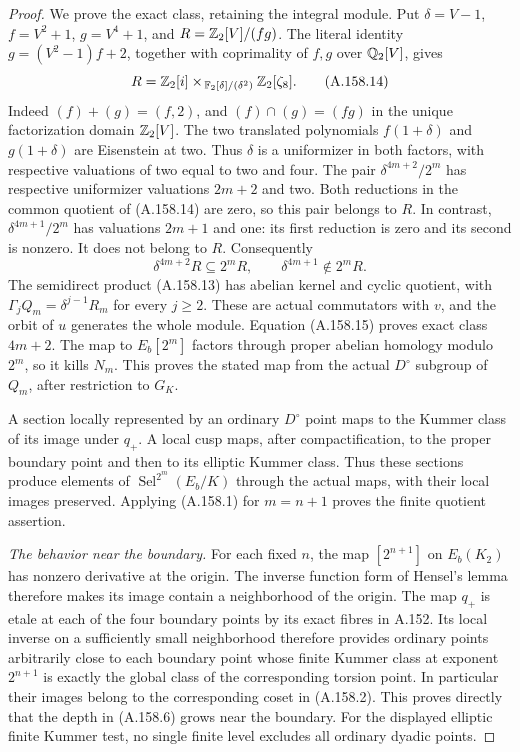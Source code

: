 \begin{proof}
We prove the exact class, retaining the integral module.
Put \(\delta=V-1\), \(f=V^2+1\), \(g=V^4+1\), and
\(R=\mathbb Z_2[V]/(fg)\).  The literal identity
\(g=(V^2-1)f+2\), together with coprimality of \(f,g\)
over \(\mathbb Q_2[V]\), gives
\[
 R=
 \mathbb Z_2[i]\mathbin{\times}_{\,\mathbb F_2[\delta]/(\delta^2)}
                   \mathbb Z_2[\zeta_8].
\tag{A.158.14}
\]
Indeed \((f)+(g)=(f,2)\), and \((f)\cap(g)=(fg)\)
in the unique factorization domain \(\mathbb Z_2[V]\).
The two translated polynomials \(f(1+\delta)\) and
\(g(1+\delta)\) are Eisenstein at two.  Thus \(\delta\)
is a uniformizer in both factors, with respective
valuations of two equal to two and four.
The pair \(\delta^{4m+2}/2^m\) has respective
uniformizer valuations \(2m+2\) and two.  Both
reductions in the common quotient of (A.158.14) are
zero, so this pair belongs to \(R\).  In contrast,
\(\delta^{4m+1}/2^m\) has valuations \(2m+1\) and one:
its first reduction is zero and its second is nonzero.
It does not belong to \(R\).  Consequently
\[
 \delta^{4m+2}R\subseteq2^mR,\qquad
                      \delta^{4m+1}\notin2^mR.
\tag{A.158.15}
\]
The semidirect product (A.158.13) has abelian kernel
and cyclic quotient, with
\(\Gamma_jQ_m=\delta^{j-1}R_m\) for every \(j\geq2\).
These are actual commutators with \(v\), and the
orbit of \(u\) generates the whole module.  Equation
(A.158.15) proves exact class \(4m+2\).
The map to \(E_b[2^m]\) factors through proper abelian
homology modulo \(2^m\), so it kills \(N_m\).
This proves the stated map from the actual \(D^\circ\)
subgroup of \(Q_m\), after restriction to \(G_K\).

A section locally represented by an ordinary \(D^\circ\)
point maps to the Kummer class of its image under \(q_+\).
A local cusp maps, after compactification, to the proper
boundary point and then to its elliptic Kummer class.
Thus these sections produce elements of
\(\operatorname{Sel}^{2^m}(E_b/K)\) through the actual
maps, with their local images preserved.  Applying
(A.158.1) for \(m=n+1\) proves the finite quotient assertion.

\emph{The behavior near the boundary.}
For each fixed \(n\), the map \([2^{n+1}]\) on \(E_b(K_2)\)
has nonzero derivative at the origin.  The inverse
function form of Hensel's lemma therefore makes its
image contain a neighborhood of the origin.
The map \(q_+\) is etale at each of the four boundary
points by its exact fibres in A.152.
Its local inverse on a sufficiently small neighborhood
therefore provides ordinary points arbitrarily close
to each boundary point whose finite Kummer class at
exponent \(2^{n+1}\) is exactly the global class of
the corresponding torsion point.  In particular their
images belong to the corresponding coset in (A.158.2).
This proves directly that the depth in (A.158.6) grows
near the boundary.  For the displayed elliptic finite
Kummer test, no single finite level excludes all ordinary
dyadic points.
\end{proof}

